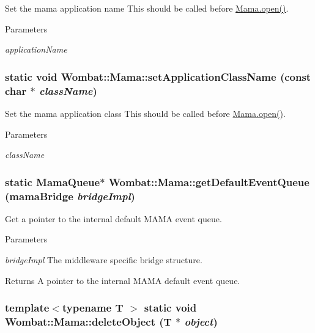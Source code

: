 Set the mama application name This should be called before \hyperlink{classWombat_1_1Mama_af1fafa88e6e22e7afc37b10de0f5a0d5}{Mama.open()}. 
\begin{DoxyParams}{Parameters}
\item[{\em applicationName}]\end{DoxyParams}
\hypertarget{classWombat_1_1Mama_ac964c759a0d0e1be140bb0aa4930e34f}{
\subsubsection[{setApplicationClassName}]{\setlength{\rightskip}{0pt plus 5cm}static void Wombat::Mama::setApplicationClassName (const char $\ast$ {\em className})}}
\label{classWombat_1_1Mama_ac964c759a0d0e1be140bb0aa4930e34f}


Set the mama application class This should be called before \hyperlink{classWombat_1_1Mama_af1fafa88e6e22e7afc37b10de0f5a0d5}{Mama.open()}. 
\begin{DoxyParams}{Parameters}
\item[{\em className}]\end{DoxyParams}
\hypertarget{classWombat_1_1Mama_a3f69282b2ccf02d2ae0d1ed6f414c627}{
\subsubsection[{getDefaultEventQueue}]{\setlength{\rightskip}{0pt plus 5cm}static {\bf MamaQueue}$\ast$ Wombat::Mama::getDefaultEventQueue (mamaBridge {\em bridgeImpl})}}
\label{classWombat_1_1Mama_a3f69282b2ccf02d2ae0d1ed6f414c627}


Get a pointer to the internal default MAMA event queue. 
\begin{DoxyParams}{Parameters}
\item[{\em bridgeImpl}]The middleware specific bridge structure. \end{DoxyParams}
\begin{DoxyReturn}{Returns}
A pointer to the internal MAMA default event queue. 
\end{DoxyReturn}
\hypertarget{classWombat_1_1Mama_a0ff6fa37b52def9d40b1174b94f76800}{
\subsubsection[{deleteObject}]{\setlength{\rightskip}{0pt plus 5cm}template$<$typename T $>$ static void Wombat::Mama::deleteObject (T $\ast$ {\em object})}}
\label{classWombat_1_1Mama_a0ff6fa37b52def9d40b1174b94f76800}


